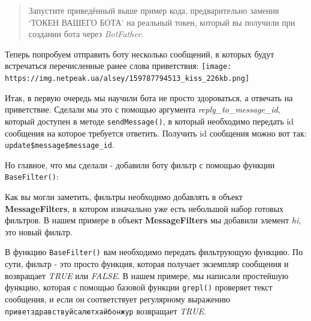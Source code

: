 \documentclass[
]{book}
\newenvironment{Shaded}{\begin{snugshade}}{\end{snugshade}}
\newcommand{\AttributeTok}[1]{\textcolor[rgb]{0.13,0.29,0.53}{#1}}
\newcommand{\CommentTok}[1]{\textcolor[rgb]{0.56,0.35,0.01}{\textit{#1}}}
\newcommand{\ConstantTok}[1]{\textcolor[rgb]{0.56,0.35,0.01}{#1}}
\newcommand{\ControlFlowTok}[1]{\textcolor[rgb]{0.13,0.29,0.53}{\textbf{#1}}}
\newcommand{\FunctionTok}[1]{\textcolor[rgb]{0.13,0.29,0.53}{\textbf{#1}}}
\newcommand{\NormalTok}[1]{#1}
\newcommand{\OtherTok}[1]{\textcolor[rgb]{0.56,0.35,0.01}{#1}}
\newcommand{\SpecialCharTok}[1]{\textcolor[rgb]{0.81,0.36,0.00}{\textbf{#1}}}
\newcommand{\StringTok}[1]{\textcolor[rgb]{0.31,0.60,0.02}{#1}}
\begin{document}
\begin{quote}
Запустите приведённый выше пример кода, предварительно заменив `ТОКЕН ВАШЕГО БОТА' на реальный токен, который вы получили при создании бота через \emph{BotFather}.
\end{quote}

Теперь попробуем отправить боту несколько сообщений, в которых будут встречаться перечисленные ранее слова приветствия:
\texttt{[image: https://img.netpeak.ua/alsey/159787794513\_kiss\_226kb.png]}

Итак, в первую очередь мы научили бота не просто здороваться, а отвечать на приветствие. Сделали мы это с помощью аргумента \emph{reply\_to\_message\_id}, который доступен в методе \texttt{sendMessage()}, в который необходимо передать id сообщения на которое требуется ответить. Получить id сообщения можно вот так: \texttt{update\$message\$message\_id}.

Но главное, что мы сделали - добавили боту фильтр с помощью функции \texttt{BaseFilter()}:

\begin{Shaded}
\end{Shaded}

Как вы могли заметить, фильтры необходимо добавлять в объект \textbf{MessageFilters}, в котором изначально уже есть небольшой набор готовых фильтров. В нашем примере в объект \textbf{MessageFilters} мы добавили элемент \emph{hi}, это новый фильтр.

В функцию \texttt{BaseFilter()} вам необходимо передать фильтрующую функцию. По сути, фильтр - это просто функция, которая получает экземпляр сообщения и возвращает \emph{TRUE} или \emph{FALSE}. В нашем примере, мы написали простейшую функцию, которая с помощью базовой функции \texttt{grepl()} проверяет текст сообщения, и если он соответствует регулярному выражению \texttt{привет\textbar{}здравствуй\textbar{}салют\textbar{}хай\textbar{}бонжур} возвращает \emph{TRUE}.
\end{document}
